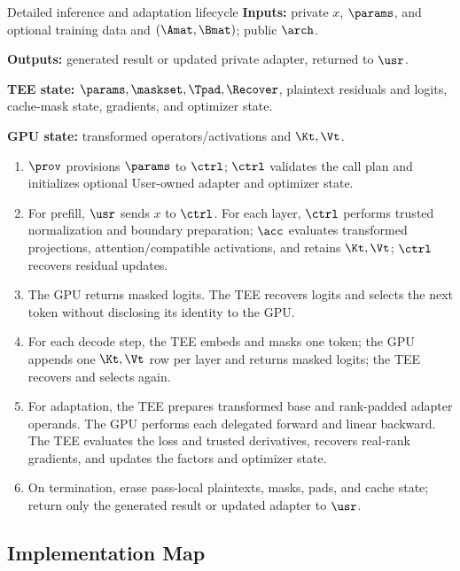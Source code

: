 \begin{methodalgorithm}{Detailed inference and adaptation lifecycle}
\label{alg:app-unified-lifecycle}
\textbf{Inputs:} private $x$, $\params$, and optional training data and
$(\Amat,\Bmat)$; public $\arch$.\par
\textbf{Outputs:} generated result or updated private adapter, returned to
$\usr$.\par
\textbf{TEE state:} $\params,\maskset,\Tpad,\Recover$, plaintext residuals and
logits, cache-mask state, gradients, and optimizer state.\par
\textbf{GPU state:} transformed operators/activations and $\Kt,\Vt$.\par
\begin{enumerate}
\setlength{\itemsep}{0pt}\setlength{\parskip}{0pt}\setlength{\parsep}{0pt}
\item $\prov$ provisions $\params$ to $\ctrl$; $\ctrl$ validates the call plan
and initializes optional User-owned adapter and optimizer state.
\item For prefill, $\usr$ sends $x$ to $\ctrl$. For each layer, $\ctrl$ performs
trusted normalization and boundary preparation; $\acc$ evaluates transformed
projections, attention/compatible activations, and retains $\Kt,\Vt$; $\ctrl$
recovers residual updates.
\item The GPU returns masked logits. The TEE recovers logits and selects the
next token without disclosing its identity to the GPU.
\item For each decode step, the TEE embeds and masks one token; the GPU appends
one $\Kt,\Vt$ row per layer and returns masked logits; the TEE recovers and
selects again.
\item For adaptation, the TEE prepares transformed base and rank-padded adapter
operands. The GPU performs each delegated forward and linear backward. The TEE
evaluates the loss and trusted derivatives, recovers real-rank gradients, and
updates the factors and optimizer state.
\item On termination, erase pass-local plaintexts, masks, pads, and cache state;
return only the generated result or updated adapter to $\usr$.
\end{enumerate}
\end{methodalgorithm}

\subsection{Implementation Map}

